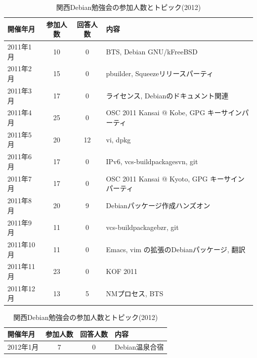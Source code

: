 \documentclass[mingoth,a4paper]{jsarticle}
\begin{document}
\pagebreak
\begin{table}
    \caption{関西Debian勉強会の参加人数とトピック(2011)}
    \begin{center}
      \begin{tabular}{|l|c|c|l|}
        \hline
        開催年月  & 参加人数 & 回答人数 & 内容 \\
        \hline
        2011年1月 &10        & 0        & BTS, Debian GNU/kFreeBSD\\
        2011年2月 &15        & 0        & pbuilder, Squeezeリリースパーティ\\
        2011年3月 &17        & 0        & ライセンス, Debianのドキュメント関連\\
        2011年4月 &25        & 0        & OSC 2011 Kansai @ Kobe, GPG キーサインパーティ \\
        2011年5月 &20        &12        & vi, dpkg \\
        2011年6月 &17        & 0        & IPv6, vcs-buildpackage{svn, git}\\
        2011年7月 &17        & 0        & OSC 2011 Kansai @ Kyoto, GPG キーサインパーティ\\
        2011年8月 &20        & 9        & Debianパッケージ作成ハンズオン\\
        2011年9月 &11        & 0        & vcs-buildpackage{bzr, git}\\
        2011年10月&11        & 0        & Emacs, vim の拡張のDebianパッケージ, 翻訳\\
        2011年11月&23        & 0        & KOF 2011\\
        2011年12月&13        & 5        & NMプロセス, BTS\\
        \hline
      \end{tabular}
    \end{center}
    \caption{関西Debian勉強会の参加人数とトピック(2012)}
    \label{tab:count2012kansai}
    \begin{center}
      \begin{tabular}{|l|c|c|l|}
        \hline
        開催年月  & 参加人数 & 回答人数 & 内容 \\
        \hline
        2012年1月 & 7        &0         & Debian温泉合宿 \\

\end{tabular}
\end{center}
\end{table}
\end{document}

